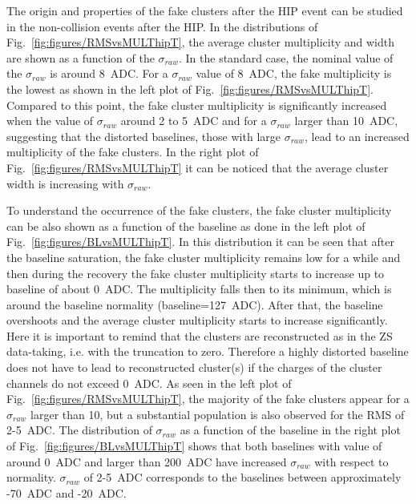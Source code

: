 
The origin and properties of the fake clusters after the HIP event can be studied in the non-collision events after the HIP. In the distributions of Fig.~\ref{fig:figures/RMSvsMULThipT}, the average cluster multiplicity and width are shown as a function of the $\sigma_{raw}$. In the standard case, the nominal value of the $\sigma_{raw}$ is around 8~ADC. For a  $\sigma_{raw}$ value of 8~ADC, the fake multiplicity is the lowest as shown in the left plot of Fig.~\ref{fig:figures/RMSvsMULThipT}. Compared to this point, the fake cluster multiplicity is significantly increased when the value of $\sigma_{raw}$  around 2 to 5~ADC and for a $\sigma_{raw}$ larger than 10~ADC, suggesting that the distorted baselines, those with large $\sigma_{raw}$, lead to an increased multiplicity of the fake clusters. In the right plot of Fig.~\ref{fig:figures/RMSvsMULThipT} it can be noticed that the average cluster width is increasing with $\sigma_{raw}$. 

To understand the occurrence of the fake clusters, the fake cluster multiplicity can be also shown as a function of the baseline as done in the left plot of Fig.~\ref{fig:figures/BLvsMULThipT}. In this distribution it can be seen that after the baseline saturation, the fake cluster multiplicity remains low for a while and then during the recovery the fake cluster multiplicity starts to increase up to baseline of about 0~ADC. The multiplicity falls then to its minimum, which is around the baseline normality (baseline=127~ADC). After that, the baseline overshoots and the average cluster multiplicity starts to increase significantly. Here it is important to remind that the clusters are reconstructed as in the ZS data-taking, i.e. with the truncation to zero. Therefore a highly distorted baseline does not have to lead to reconstructed cluster(s) if the charges of the cluster channels do not exceed 0~ADC.  As seen in the left plot of Fig.~\ref{fig:figures/RMSvsMULThipT}, the majority of the fake clusters appear for a $\sigma_{raw}$ larger than 10, but a substantial population is also observed for the RMS of 2-5~ADC. The distribution of  $\sigma_{raw}$ as a function of the baseline in the right plot of Fig.~\ref{fig:figures/BLvsMULThipT} shows that both baselines with value of around 0~ADC and larger than 200~ADC have increased $\sigma_{raw}$ with respect to normality. $\sigma_{raw}$ of 2-5~ADC corresponds to the baselines between approximately -70~ADC and -20~ADC. 

